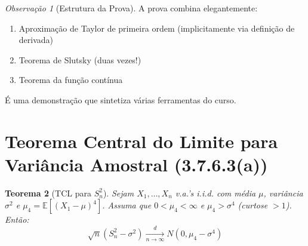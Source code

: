 \documentclass[12pt,a4paper]{article}
\theoremstyle{plain}
\newtheorem{teorema}{Teorema}[section]
\theoremstyle{definition}
\theoremstyle{remark}
\newtheorem{observacao}[teorema]{Observação}
\begin{document}
\begin{observacao}[Estrutura da Prova]
A prova combina elegantemente:
\begin{enumerate}
    \item Aproximação de Taylor de primeira ordem (implicitamente via definição de derivada)
    \item Teorema de Slutsky (duas vezes!)
    \item Teorema da função contínua
\end{enumerate}
É uma demonstração que sintetiza várias ferramentas do curso.
\end{observacao}

\section{Teorema Central do Limite para Variância Amostral (3.7.6.3(a))}

\begin{teorema}[TCL para $S_n^2$]
Sejam $X_1, \ldots, X_n$ v.a.'s i.i.d. com média $\mu$, variância $\sigma^2$ e $\mu_4 = \mathbb{E}[(X_1 - \mu)^4]$. Assuma que $0 < \mu_4 < \infty$ e $\mu_4 > \sigma^4$ (curtose $> 1$). Então:
\[
\sqrt{n} \left( S_n^2 - \sigma^2 \right) \xrightarrow[n \to \infty]{d} N\left(0, \mu_4 - \sigma^4\right)
\]
\end{teorema}
\end{document}
